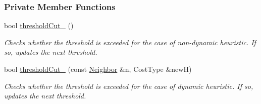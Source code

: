 \subsubsection*{Private Member Functions}
\begin{DoxyCompactItemize}
\item 
bool \hyperlink{structslb_1_1ext_1_1algorithm_1_1IdAstar_a60399d66c51ba26775ea268ada4cc9dc}{threshold\+Cut\+\_\+} ()
\begin{DoxyCompactList}\small\item\em Checks whether the threshold is exceeded for the case of non-\/dynamic heuristic. If so, updates the next threshold. \end{DoxyCompactList}\item 
bool \hyperlink{structslb_1_1ext_1_1algorithm_1_1IdAstar_a7cd2bb006b878a3c21df363ef3634c51}{threshold\+Cut\+\_\+} (const \hyperlink{structslb_1_1ext_1_1algorithm_1_1IdAstar_a8c382f5126c7c1038ecd676e75e174db}{Neighbor} \&n, Cost\+Type \&newH)
\begin{DoxyCompactList}\small\item\em Checks whether the threshold is exceeded for the case of dynamic heuristic. If so, updates the next threshold. \end{DoxyCompactList}\end{DoxyCompactItemize}
